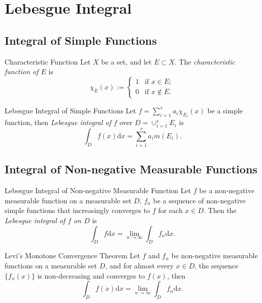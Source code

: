 

\section{Lebesgue Integral}

\subsection{Integral of Simple Functions}

\begin{definition}{Characteristic Function}{}
  Let $X$ be a set, and let $E \subset X$.
  The \emph{characteristic function of $E$} is
  \begin{equation}
    \chi_E(x) :=
    \begin{cases}
      1 & \text{if } x \in E;\\
      0 & \text{if } x \not \in E.
    \end{cases}
  \end{equation}
\end{definition}

\begin{definition}{Lebesgue Integral of Simple Functions}{}
  Let $f = \sum _{i = 1}^s a_i \chi_{E_i}(x)$ be a simple function,
  then \emph{Lebesgue integral of $f$} over $D = \cup _{i = 1}^s E_i$ is
  \begin{equation}
    \int_D f(x)\mathrm{d} x = \sum\limits_{i = 1}^s a_i m(E_i).
  \end{equation}
\end{definition}

\subsection{Integral of Non-negative Measurable Functions}

\begin{definition}{Lebesgue Integral of Non-negative Measurable Function}{}
  Let $f$ be a non-negative measurable function on a measurable set $D$,
  $f_n$ be a sequence of non-negative simple functions that increasingly
  converges to $f$ for each $x \in D$.
  Then the \emph{Lebesgue integral of $f$ on $D$} is
  \begin{equation}
    \int_D f \mathrm{d} x= \lim \limits _{n \rightarrow \infty} \int_D f_n \mathrm{d} x.
  \end{equation}
\end{definition}

\begin{theorem}{Levi's Monotone Convergence Theorem}{}
  Let $f$ and $f_n$ be non-negative measurable functions on a measurable set
  $D$,
  and for almost every $x \in D$, the sequence $\{f_n(x)\}$ is non-decreasing
  and converges to $f(x)$, then
  \begin{equation}
    \int_D f(x)\mathrm{d} x = \lim \limits _{n \rightarrow \infty} \int_D f_n\mathrm{d} x.
  \end{equation}
\end{theorem}

